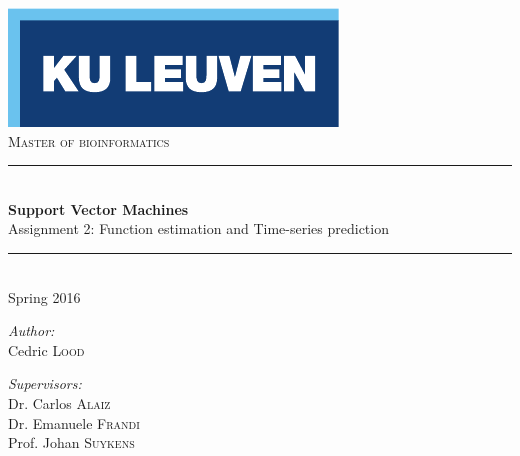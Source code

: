 \begin{titlepage}
  \begin{center}
    
    \includegraphics[scale=1.5]{figures/kuleuven_logo.pdf}~\\[4.5cm]
    \textsc{\Large Master of bioinformatics}\\[0.5cm]

    \rule{\linewidth}{0.3mm}\\[0.4cm]
    {\huge \bfseries Support Vector Machines} \\[0.4cm]
    {\large Assignment 2: Function estimation and Time-series prediction} \\[0.4cm]
    \rule{\linewidth}{0.3mm}\\[0.4cm]
    {\large Spring 2016} \\[1.0cm]
    
    \begin{minipage}{0.4\textwidth}
      \begin{flushleft} \large
        \emph{Author:}\\
	Cedric \textsc{Lood}
      \end{flushleft}
    \end{minipage}
    \begin{minipage}{0.4\textwidth}
      \begin{flushright} \large
        \emph{Supervisors:} \\
        Dr. Carlos \textsc{Alaiz}\\
        Dr. Emanuele \textsc{Frandi}\\
        Prof. Johan \textsc{Suykens}\\
        \hfill \newline 
      \end{flushright}
    \end{minipage}
    
    \vfill


\end{center}
\end{titlepage}
